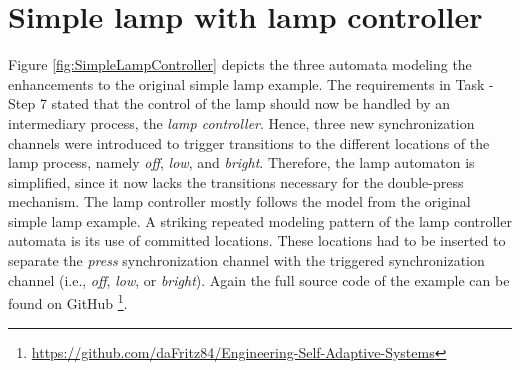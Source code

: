 \documentclass{article}
\begin{document}

\section{Simple lamp with lamp controller}

Figure \ref{fig:SimpleLampController} depicts the three automata modeling the enhancements to the original simple lamp example. The requirements in Task - Step 7 stated that the control of the lamp should now be handled by an intermediary process, the \textit{lamp controller}. Hence, three new synchronization channels were introduced to trigger transitions to the different locations of the lamp process, namely \textit{off}, \textit{low}, and \textit{bright}. Therefore, the lamp automaton is simplified, since it now lacks the transitions necessary for the double-press mechanism. The lamp controller mostly follows the model from the original simple lamp example. A striking repeated modeling pattern of the lamp controller automata is its use of committed locations. These locations had to be inserted to separate the \textit{press} synchronization channel with the triggered synchronization channel (i.e., \textit{off}, \textit{low}, or \textit{bright}). Again the full source code of the example can be found on GitHub \footnote{\url{https://github.com/daFritz84/Engineering-Self-Adaptive-Systems}}. 
\end{document}
